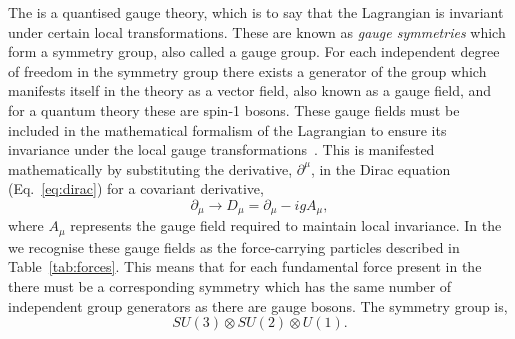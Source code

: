 The \SM is a quantised gauge theory, which is to say that the \SM Lagrangian is invariant under certain local transformations. These are known as \textit{gauge symmetries} which form a symmetry group, also called a gauge group. For each independent degree of freedom in the symmetry group there exists a generator of the group which manifests itself in the theory as a vector field, also known as a gauge field, and for a quantum theory these are spin-1 bosons. These gauge fields must be included in the mathematical formalism of the Lagrangian to ensure its invariance under the local gauge transformations~\cite{Guidry}. This is manifested mathematically by substituting the derivative, $\partial^{\mu}$, in the Dirac equation (Eq.~\ref{eq:dirac}) for a covariant derivative,
\begin{equation}
  \partial_{\mu} \rightarrow D_{\mu} = \partial_{\mu}-igA_{\mu},
\end{equation}
where $A_{\mu}$ represents the gauge field required to maintain local invariance. In the \SM we recognise these gauge fields as the force-carrying particles described in Table~\ref{tab:forces}. This means that for each fundamental force present in the \SM there must be a corresponding symmetry which has the same number of independent group generators as there are gauge bosons. The \SM symmetry group is,
\begin{equation}
  SU(3) \otimes SU(2) \otimes U(1).
\end{equation}

